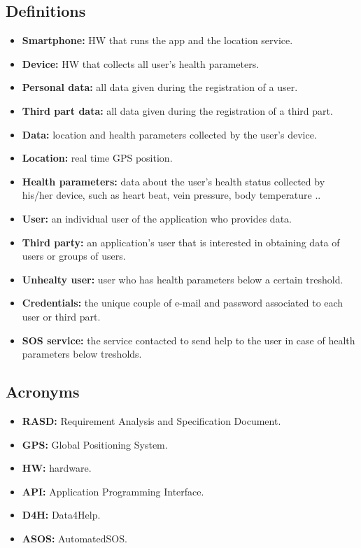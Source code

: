 \subsection{Definitions}
	\begin{itemize}
		\item {\textbf{Smartphone:} HW that runs the app and the location service.}
		\item {\textbf{Device:} HW that collects all user's health parameters.}

		\item {\textbf{Personal data:} all data given during the registration of a user.}
		\item {\textbf{Third part data:} all data given during the registration of a third part.}
		\item {\textbf{Data:} location and health parameters collected by the user's device.}
		\item {\textbf{Location:} real time GPS position.}
		\item {\textbf{Health parameters:} data about the user's health status collected by his/her device, such as heart beat, 						vein pressure, body temperature ..}

		\item {\textbf{User:} an individual user of the application who provides data.}
		\item {\textbf{Third party:} an application's user that is interested in obtaining data of users or groups of users.} 
		\item {\textbf{Unhealty user:} user who has health parameters below a certain treshold.}
		\item {\textbf{Credentials:} the unique couple of e-mail and password associated to each user or third part.}

		\item{\textbf{SOS service:} the service contacted to send help to the user in case of health parameters below tresholds.}
	\end {itemize}

\subsection{Acronyms}
	\begin{itemize}
		\item {\textbf {RASD:} Requirement Analysis and Specification Document.}
		\item {\textbf {GPS:} Global Positioning System.}
		\item {\textbf {HW:} hardware.}
		\item {\textbf {API:} Application Programming Interface.}
		\item {\textbf {D4H:} Data4Help.} 
		\item {\textbf {ASOS:} AutomatedSOS.}
	\end{itemize}

